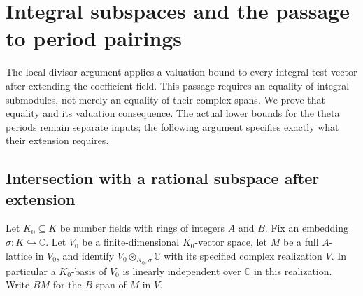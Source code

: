 \section{Integral subspaces and the passage to period pairings}
\label{ip-section}

The local divisor argument applies a valuation bound to every integral
test vector after extending the coefficient field. This passage requires
an equality of integral submodules, not merely an equality of their
complex spans. We prove that equality and its valuation consequence.
The actual lower bounds for the theta periods remain separate inputs;
the following argument specifies exactly what their extension requires.

\subsection{Intersection with a rational subspace after extension}

Let $K_0\subseteq K$ be number fields with rings of integers $A$ and
$B$. Fix an embedding $\sigma:K\hookrightarrow\mathbb C$.
Let $V_0$ be a finite-dimensional $K_0$-vector space, let $M$ be a
full $A$-lattice in $V_0$, and identify
$V_0\otimes_{K_0,\sigma}\mathbb C$ with its specified complex
realization $V$. In particular a $K_0$-basis of $V_0$ is linearly
independent over $\mathbb C$ in this realization. Write $BM$ for
the $B$-span of $M$ in $V$.


